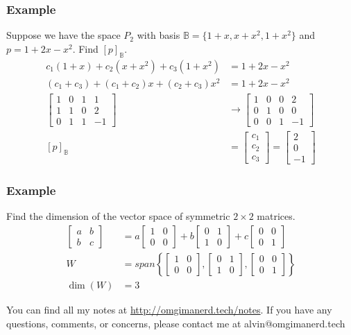 \documentclass{math}
\begin{document}
\subsubsection*{Example}
Suppose we have the space \( P_2 \) with basis \( \mathbb{B} =
\{1+x,x+x^2,1+x^2\} \) and \( p = 1+2x-x^2 \). Find \( [p]_{\mathbb{B}} \).
\begin{align*}
  c_1(1+x)+c_2(x+x^2)+c_3(1+x^2) &= 1+2x-x^2 \\
  (c_1+c_3)+(c_1+c_2)x+(c_2+c_3)x^2 &= 1+2x-x^2 \\
  \left[\begin{array}{ccc|c}
    1 & 0 & 1 & 1 \\
    1 & 1 & 0 & 2 \\
    0 & 1 & 1 & -1
  \end{array}\right] &\to \left[\begin{array}{ccc|c}
    1 & 0 & 0 & 2 \\
    0 & 1 & 0 & 0 \\
    0 & 0 & 1 & -1
  \end{array}\right] \\
  [p]_{\mathbb{B}} &= \begin{bmatrix}c_1 \\ c_2 \\ c_3\end{bmatrix} =
    \begin{bmatrix}2 \\ 0 \\ -1\end{bmatrix}
\end{align*}

\subsubsection*{Example}
Find the dimension of the vector space of symmetric \( 2\times2 \) matrices.
\begin{align*}
  \begin{bmatrix}a & b \\ b & c\end{bmatrix} &=
    a\begin{bmatrix}1 & 0 \\ 0 & 0\end{bmatrix}+
    b\begin{bmatrix}0 & 1 \\ 1 & 0\end{bmatrix}+
    c\begin{bmatrix}0 & 0 \\ 0 & 1\end{bmatrix} \\
  W &= span\left\{
    \begin{bmatrix}1 & 0 \\ 0 & 0\end{bmatrix},
    \begin{bmatrix}0 & 1 \\ 1 & 0\end{bmatrix},
    \begin{bmatrix}0 & 0 \\ 0 & 1\end{bmatrix}
  \right\} \\
  \dim(W) &= 3
\end{align*}

\begin{center}
  You can find all my notes at \url{http://omgimanerd.tech/notes}. If you have
  any questions, comments, or concerns, please contact me at
  alvin@omgimanerd.tech
\end{center}
\end{document}
